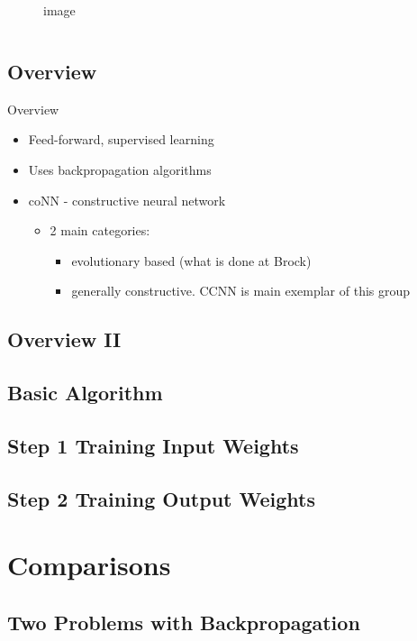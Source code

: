 \documentclass{beamer}
\begin{document}
\begin{frame}
\begin{columns}[t]
\begin{column}{0.5\textwidth}
\begin{figure}
        \caption{image}
      \end{figure}			
		\end{column}
	\end{columns}
\end{frame}



\subsection{Overview}
\begin{block}{Overview}
\begin{itemize}
\item Feed-forward, supervised learning
\item Uses backpropagation algorithms
\item coNN - constructive neural network
\begin{itemize}
\item 2 main categories:
\begin{itemize}
\item evolutionary based (what is done at Brock)
\item generally constructive. CCNN is main exemplar of this group
\end{itemize}
\end{itemize}
\end{itemize}
\end{block}

\subsection{Overview II}


\subsection{Basic Algorithm}


\subsection{Step 1 Training Input Weights}
\subsection{Step 2 Training Output Weights}


\section{Comparisons}
\subsection{Two Problems with Backpropagation}
\end{document}

